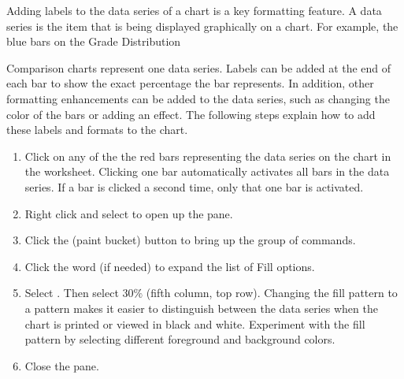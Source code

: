 Adding labels to the data series of a chart is a key formatting feature. A data series is the item that is being displayed graphically on a chart. For example, the blue bars on the Grade Distribution

Comparison charts represent one data series. Labels can be added at the end of each bar to show the exact percentage the bar represents. In addition, other formatting enhancements can be added to the data series, such as changing the color of the bars or adding an effect. The following steps explain how to add these labels and formats to the chart.

\begin{enumerate}
	\item Click on any of the the red bars representing the  data series on the  chart in the  worksheet. Clicking one bar automatically activates all bars in the data series. If a bar is clicked a second time, only that one bar is activated.
	\item Right click and select  to open up the  pane.
	\item Click the  (paint bucket) button to bring up the  group of commands.
	\item Click the word  (if needed) to expand the list of Fill options.
	\item Select . Then select $ 30\% $ (fifth column, top row). Changing the fill pattern to a pattern makes it easier to distinguish between the data series when the chart is printed or viewed in black and white. Experiment with the fill pattern by selecting different foreground and background colors.
	\item Close the  pane.
\end{enumerate}

